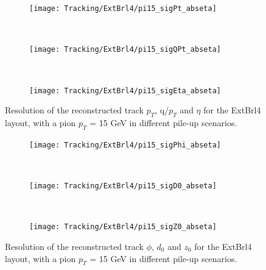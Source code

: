 \documentclass[a4paper,twoside,12pt]{book}
\begin{document}
\begin{figure}
\begin{subfigure}{\linewidth}
\centering
\texttt{[image: Tracking/ExtBrl4/pi15\_sigPt\_abseta]}
\caption{}
\label{fig:tracking:pi15_sigPt_abseta_ExtBrl4}
\end{subfigure}\\[1ex]
\begin{subfigure}{\linewidth}
\centering
\texttt{[image: Tracking/ExtBrl4/pi15\_sigQPt\_abseta]}
\caption{}
\label{fig:tracking:pi15_sigQPt_abseta_ExtBrl4}
\end{subfigure}\\[1ex]
\begin{subfigure}{\linewidth}
\centering
\texttt{[image: Tracking/ExtBrl4/pi15\_sigEta\_abseta]}
\caption{}
\label{fig:tracking:pi15_sigEta_abseta_ExtBrl4}
\end{subfigure}
\caption{Resolution of the reconstructed track $p_{T}$, q/$p_{T}$ and $\eta$ for the ExtBrl4 layout, with a pion $p_{T}$ = 15 GeV in different pile-up scenarios.}
\label{fig:tracking:resolutionPileup_ExtBrl4-1}
\end{figure}

\begin{figure}
\begin{subfigure}{\linewidth}
\centering
\texttt{[image: Tracking/ExtBrl4/pi15\_sigPhi\_abseta]}
\caption{}
\label{fig:tracking:pi15_sigPhi_abseta_ExtBrl4}
\end{subfigure}\\[1ex]
\begin{subfigure}{\linewidth}
\centering
\texttt{[image: Tracking/ExtBrl4/pi15\_sigD0\_abseta]}
\caption{}
\label{fig:tracking:pi15_sigD0_abseta_ExtBrl4}
\end{subfigure}\\[1ex]
\begin{subfigure}{\linewidth}
\centering
\texttt{[image: Tracking/ExtBrl4/pi15\_sigZ0\_abseta]}
\caption{}
\label{fig:tracking:pi15_sigZ0_abseta_ExtBrl4}
\end{subfigure}
\caption{Resolution of the reconstructed track $\phi$, $d_{0}$ and $z_{0}$ for the ExtBrl4 layout, with a pion $p_{T}$ = 15 GeV in different pile-up scenarios.}
\label{fig:tracking:resolutionPileup_ExtBrl4-2}
\end{figure}

\end{document}
